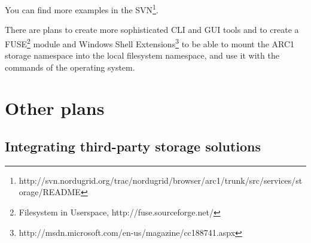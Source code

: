 \documentclass{book}
\begin{document}
You can find more examples in the SVN\footnote{http://svn.nordugrid.org/trac/nordugrid/browser/arc1/trunk/src/services/storage/README}.

There are plans to create more sophisticated CLI and GUI tools and to create a FUSE\footnote{Filesystem in Userspace, http://fuse.sourceforge.net/} module and Windows Shell Extensions\footnote{http://msdn.microsoft.com/en-us/magazine/cc188741.aspx} to be able to mount the ARC1 storage namespace into the local filesystem namespace, and use it with the commands of the operating system.


\section{Other plans} %

\subsection{Integrating third-party storage solutions} %
\label{sub:integrating_third_party_storage_solutions}
\end{document}
